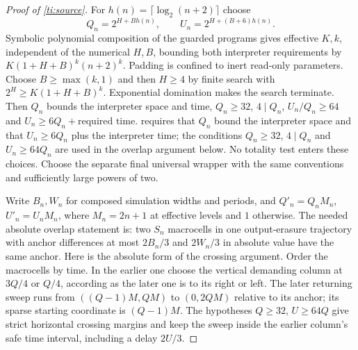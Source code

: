 \begin{proof}[Proof of \cref{ti:source}]
For $h(n)=\lceil\log_2(n+2)\rceil$ choose
\[
 Q_n=2^{H+B h(n)},\qquad U_n=2^{H+(B+6)h(n)}.
\]
Symbolic polynomial composition of the guarded programs gives effective $K,k$, independent of the numerical $H,B$, bounding both interpreter requirements by $K(1+H+B)^k(n+2)^k$. Padding is confined to inert read-only parameters. Choose $B\ge\max(k,1)$ and then $H\ge4$ by finite search with $2^H\ge K(1+H+B)^k$. Exponential domination makes the search terminate. Then $Q_n$ bounds the interpreter space and time, $Q_n\ge32$, $4\mid Q_n$, $U_n/Q_n\ge64$ and $U_n\ge6Q_n+\text{required time}$. \cite[Lemma~24]{Torma15} requires that $Q_n$ bound the interpreter space and that $U_n\ge6Q_n$ plus the interpreter time; the conditions $Q_n\ge32$, $4\mid Q_n$ and $U_n\ge64Q_n$ are used in the overlap argument below. No totality test enters these choices. Choose the separate final universal wrapper with the same conventions and sufficiently large powers of two.

Write $B_n,W_n$ for composed simulation widths and periods, and $Q'_n=Q_nM_n$, $U'_n=U_nM_n$, where $M_n=2n+1$ at effective levels and $1$ otherwise. The needed absolute overlap statement is: two $S_n$ macrocells in one output-erasure trajectory with anchor differences at most $2B_n/3$ and $2W_n/3$ in absolute value have the same anchor. Here is the absolute form of the crossing argument. Order the macrocells by time. In the earlier one choose the vertical demanding column at $3Q/4$ or $Q/4$, according as the later one is to its right or left. The later returning sweep runs from $((Q-1)M,QM)$ to $(0,2QM)$ relative to its anchor; its sparse starting coordinate is $(Q-1)M$. The hypotheses $Q\ge32$, $U\ge64Q$ give strict horizontal crossing margins and keep the sweep inside the earlier column's safe time interval, including a delay $2U/3$.


\end{proof}
